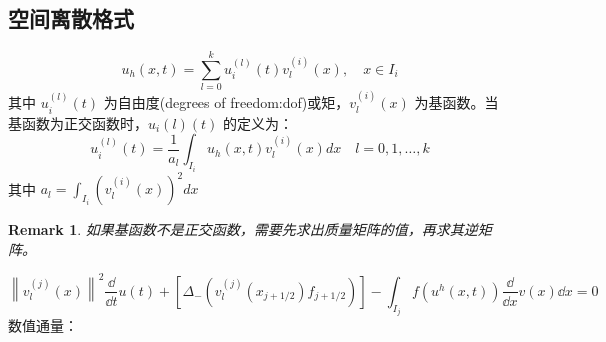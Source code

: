 \documentclass{article}
\newtheorem{remark}{Remark}
\numberwithin{equation}{subsection}    %
\begin{document}
\subsection{空间离散格式}
\begin{equation}
    u_{h}(x, t)=\sum_{l=0}^{k} u_{i}^{(l)}(t) v_{l}^{(i)}(x), \quad x \in I_{i}
\end{equation}
其中 $u_i^{(l)}(t)$ 为自由度(degrees of freedom:dof)或矩，$v_l^{(i)}(x)$ 为基函数。当基函数为正交函数时，$u_i{(l)}(t)$ 的定义为：
\begin{equation}
    u_{i}^{(l)}(t)=\frac{1}{a_{l}} \int_{I_{i}} u_{h}(x, t) v_{l}^{(i)}(x) d x \quad l=0,1, \ldots, k
\end{equation}
其中 $a_{l}=\int_{I_{i}}\left(v_{l}^{(i)}(x)\right)^{2} d x$
\begin{remark}
    如果基函数不是正交函数，需要先求出质量矩阵的值，再求其逆矩阵。
\end{remark}

\begin{equation}
    \left\|v_{l}^{(j)}(x)\right\|^{2} \dfrac{\dd}{\dd t} u(t)+\left[\Delta_{-}\left(v_{l}^{(j)}\left(x_{j+1 / 2}\right) f_{j+1 / 2}\right)\right]-\int_{I_{j}} f\left(u^{h}(x, t)\right) \dfrac{\dd}{\dd x} v(x) \dd x=0
\end{equation}
数值通量：
\end{document}
